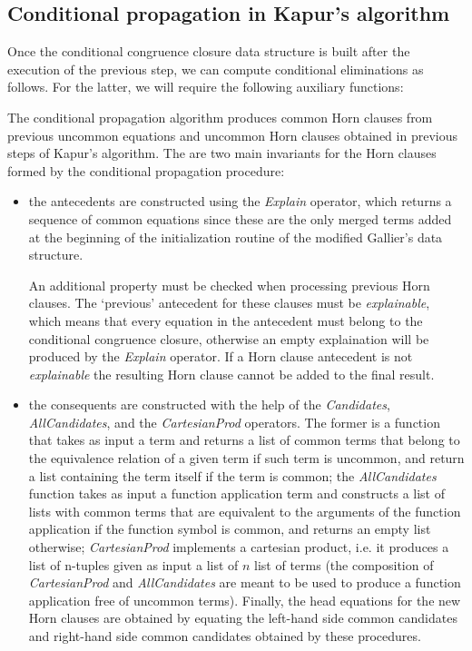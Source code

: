\subsection{Conditional propagation in Kapur's algorithm}

Once the conditional congruence closure data structure is built after 
the execution of the previous step, we can compute conditional eliminations
as follows. For the latter, we will require the following auxiliary functions:







The conditional propagation algorithm produces common Horn clauses from previous
uncommon equations and uncommon Horn clauses obtained in previous steps of Kapur's
algorithm. The are two main invariants for the Horn clauses formed by the
conditional propagation procedure: 

\begin{itemize}
  \item the antecedents are constructed using the \emph{Explain} operator, 
    which returns a sequence of common equations since these are the 
    only merged terms added at the beginning of the initialization 
    routine of the modified Gallier's data structure.

    An additional property must be checked when processing previous
    Horn clauses. The `previous' antecedent for these clauses must be \emph{explainable},
    which means that every equation in the antecedent must belong to the conditional
    congruence closure, otherwise an empty explaination will be produced by the
    \emph{Explain} operator. If a Horn clause antecedent is not \emph{explainable}
    the resulting Horn clause cannot be added to the final result.

  \item the consequents are constructed with the help of the \emph{Candidates},
    \emph{AllCandidates}, and the \emph{CartesianProd} operators. 
    The former is a function that takes as input
    a term and returns a list of common terms
    that belong to the equivalence relation of a given term if such term is uncommon,
    and return a list containing the term itself if the term is common; the 
    \emph{AllCandidates} function takes as input a function application term and
    constructs a list of lists with common terms that are equivalent to the arguments
    of the function application if the function symbol is common, and returns an empty
    list otherwise; \emph{CartesianProd} implements a cartesian product, i.e. it 
    produces a list of n-tuples given as input a list of $n$ list of terms (the 
      composition of \emph{CartesianProd} and \emph{AllCandidates} are meant to be
    used to produce a function application free of uncommon terms). Finally, the
    head equations for the new Horn clauses are obtained by equating the left-hand
    side common candidates and right-hand side common candidates obtained by these 
    procedures.

\end{itemize}

